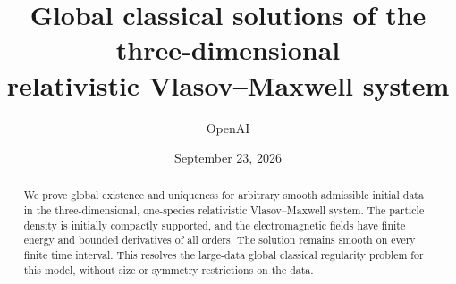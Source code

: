 \documentclass[11pt]{article}
\title{Global classical solutions of the three-dimensional\\relativistic Vlasov--Maxwell system}
\author{OpenAI}
\date{September 23, 2026}
\theoremstyle{definition}
\theoremstyle{remark}
\numberwithin{equation}{section}
\begin{document}
\maketitle
\begin{abstract}
We prove global existence and uniqueness for arbitrary smooth admissible
initial data in the three-dimensional, one-species relativistic Vlasov--Maxwell
system. The particle density is initially compactly supported, and the
electromagnetic fields have finite energy and bounded derivatives of all orders.
The solution remains smooth on every finite time interval. This resolves the
large-data global classical regularity problem for this model, without size or
symmetry restrictions on the data.
\end{abstract}
\tableofcontents












\end{document}
